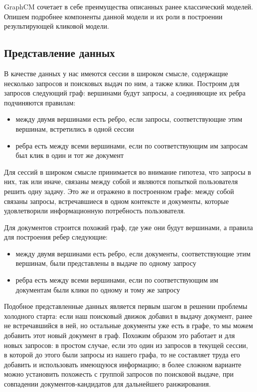 \documentclass[diploma]{nanolab2015}
\begin{document}
GraphCM \cite{GraphCM} сочетает в себе преимущества описанных ранее классический моделей. Опишем подробнее компоненты данной модели и их роли в построении результирующей кликовой модели.

\subsection{Представление данных}
В качестве данных у нас имеются сессии в широком смысле, содержащие несколько запросов и поисковых выдач по ним, а также клики. Построим для запросов следующий граф: вершинами будут запросы, а соединяющие их ребра подчиняются правилам:
\begin{itemize}
  \item между двумя вершинами есть ребро, если запросы, соответствующие этим вершинам, встретились в одной сессии
  \item ребра есть между всеми вершинами, если по соответствующим им запросам был клик в один и тот же документ
\end{itemize}

Для сессий в широком смысле принимается во внимание гипотеза, что запросы в них, так или иначе, связаны между собой и являются попыткой пользователя решить одну задачу. Это же и отражено в построенном графе: между собой связаны запросы, встречавшиеся в одном контексте и документы, которые удовлетворили информационную потребность пользователя.

Для документов строится похожий граф, где уже они будут вершинами, а правила для построения ребер следующие:
\begin{itemize}
  \item между двумя вершинами есть ребро, если документы, соответствующие этим вершинам, были представлены в выдаче по одному запросу
  \item ребра есть между всеми вершинами, если по соответствующим им документам были клики по одному и тому же запросу
\end{itemize}

Подобное представленные данных является первым шагом в решении проблемы холодного старта: если наш поисковый движок добавил в выдачу документ, ранее не встречавшийся в ней, но остальные документы уже есть в графе, то мы можем добавить этот новый документ в граф. Похожим образом это работает и для новых запросов: в простом случае, если это один из запросов в текущей сессии, в которой до этого были запросы из нашего графа, то не составляет труда его добавить и использовать имеющуюся информацию; в более сложном варианте можно установить похожесть с группой запросов по поисковой выдаче, при совпадении документов-кандидатов для дальнейшего ранжирования.
\end{document}
